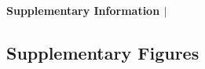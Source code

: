 


\begin{center}
  {\Large{\bf Supplementary Information $|$} }
  {\large\authorlistplain} 
\end{center}

\subsection*{Supplementary Figures}


\let\definesuppcaption\suppfigurewithcaption


